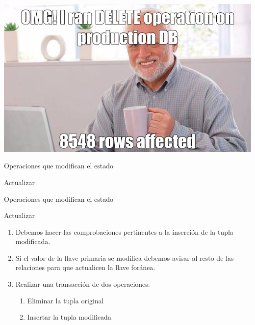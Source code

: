 {
{
    \includegraphics[width=\paperwidth,height=\paperheight]{img/delete.jpg}
}
\begin{frame}
\end{frame}
}

\begin{frame}{Operaciones que modifican el estado}
    \begin{block}{Actualizar}
      
    \end{block}

\end{frame}

\begin{frame}{Operaciones que modifican el estado}
    \begin{block}{Actualizar}
        \begin{enumerate}
            \item Debemos hacer las comprobaciones pertinentes a la inserci\'on de la tupla modificada.
            \item<2-> Si el valor de la llave primaria se modifica debemos avisar al resto de las relaciones para que actualicen
            la llave for\'anea.
            \item<3-> Realizar una transacci\'on de dos operaciones: \begin{enumerate}
                \item Eliminar la tupla original
                \item Insertar la tupla modificada
            \end{enumerate}
        \end{enumerate}
        
    \end{block}
\end{frame}

